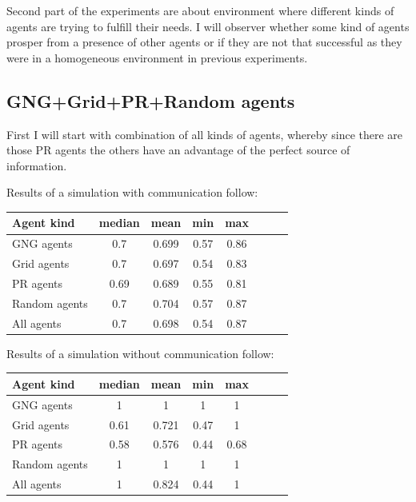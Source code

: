 Second part of the experiments are about environment where different kinds of agents are trying to fulfill their needs. I will observer whether some kind of agents prosper from a presence of other agents or if they are not that successful as they were in a homogeneous environment in previous experiments.
                                                                                
\subsection{GNG+Grid+PR+Random agents}

First I will start with combination of all kinds of agents, whereby since there are those PR agents the others have an advantage of the perfect source of information.  

Results of a simulation with communication follow:
         
\begin{center}   
  \begin{tabular}{l*{6}{c}r}
  Agent kind        & median & mean & min & max \\
  \hline
  GNG agents        & 0.7 & 0.699 & 0.57 & 0.86  \\
  Grid agents       & 0.7 & 0.697 & 0.54 & 0.83  \\   
  PR agents         & 0.69 & 0.689 & 0.55 & 0.81 \\  
  Random agents     & 0.7 & 0.704 & 0.57 & 0.87  \\
  All agents        & 0.7 & 0.698 & 0.54 & 0.87  \\ 
  \end{tabular}                  
\end{center}
       
Results of a simulation without communication follow:
              
\begin{center}
  \begin{tabular}{l*{6}{c}r}
  Agent kind        & median & mean & min & max \\
  \hline
  GNG agents        & 1 & 1 & 1 & 1  \\
  Grid agents       & 0.61 & 0.721 & 0.47 & 1  \\   
  PR agents         & 0.58 & 0.576 & 0.44 & 0.68 \\  
  Random agents     & 1 & 1 & 1 & 1  \\
  All agents        & 1 & 0.824 & 0.44 & 1  \\ 
  \end{tabular}                    
\end{center} 

